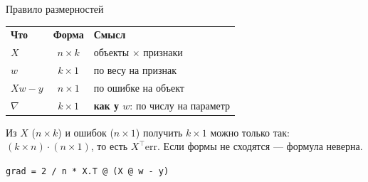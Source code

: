 \begin{frame}[c]{Правило размерностей}

  \medskip
  \centering
  \begin{tabular}{lcl}
    \textbf{Что} & \textbf{Форма} & \textbf{Смысл}\\
    $X$ & $n\times k$ & объекты $\times$ признаки\\
    $w$ & $k\times 1$ & по весу на признак\\
    $Xw - y$ & $n\times 1$ & по ошибке на объект\\
    $\nabla$ & $k\times 1$ & \textbf{как у $w$}: по числу на параметр\\
  \end{tabular}

  \medskip
  \raggedright\small
  Из $X$ ($n\times k$) и ошибок ($n\times1$) получить $k\times1$ можно только так:
  $(k\times n)\cdot(n\times 1)$, то есть $X^\top\mathrm{err}$. Если формы не сходятся --- формула неверна.

  \medskip
  \centerline{\texttt{grad = 2 / n * X.T @ (X @ w - y)}}
\end{frame}
